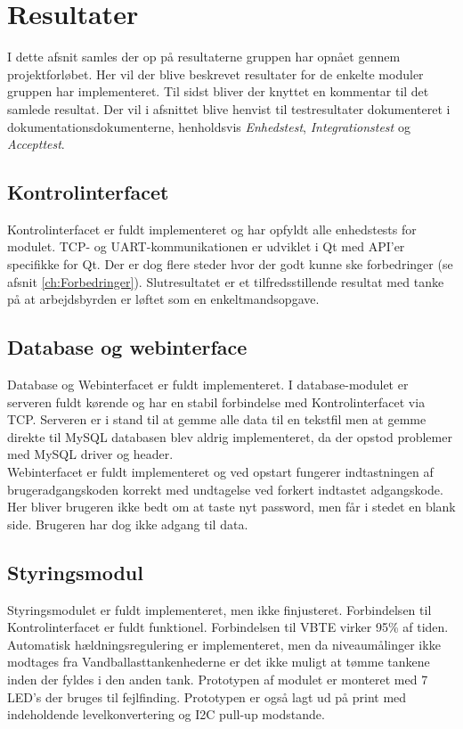 \section{Resultater}
\label{ch:Resultater}
I dette afsnit samles der op på resultaterne gruppen har opnået gennem projektforløbet. Her vil der blive beskrevet resultater for de enkelte moduler gruppen har implementeret. Til sidst bliver der knyttet en kommentar til det samlede resultat. Der vil i afsnittet blive henvist til testresultater dokumenteret i dokumentationsdokumenterne, henholdsvis \textit{Enhedstest}, \textit{Integrationstest} og \textit{Accepttest}.

\subsection{Kontrolinterfacet}
Kontrolinterfacet er fuldt implementeret og har opfyldt alle enhedstests for modulet. TCP- og UART-kommunikationen er udviklet i Qt med API'er specifikke for Qt. Der er dog flere steder hvor der godt kunne ske forbedringer (se afsnit \ref{ch:Forbedringer}). Slutresultatet er et tilfredsstillende resultat med tanke på at arbejdsbyrden er løftet som en enkeltmandsopgave.\\

\subsection{Database og webinterface}
Database og Webinterfacet er fuldt implementeret. I database-modulet er serveren fuldt kørende og har en stabil forbindelse med Kontrolinterfacet via TCP. Serveren er i stand til at gemme alle data til en tekstfil men at gemme direkte til MySQL databasen blev aldrig implementeret, da der opstod problemer med MySQL driver og header.\\
Webinterfacet er fuldt implementeret og ved opstart fungerer indtastningen af brugeradgangskoden korrekt med undtagelse ved forkert indtastet adgangskode. Her bliver brugeren ikke bedt om at taste nyt password, men får i stedet en blank side. Brugeren har dog ikke adgang til data.

\subsection{Styringsmodul}
Styringsmodulet er fuldt implementeret, men ikke finjusteret. Forbindelsen til Kontrolinterfacet er fuldt funktionel. Forbindelsen til VBTE virker 95\% af tiden. Automatisk hældningsregulering er implementeret, men da niveaumålinger ikke modtages fra Vandballasttankenhederne er det ikke muligt at tømme tankene inden der fyldes i den anden tank. Prototypen af modulet er monteret med 7 LED's der bruges til fejlfinding. Prototypen er også lagt ud på print med indeholdende levelkonvertering og I2C pull-up modstande.

